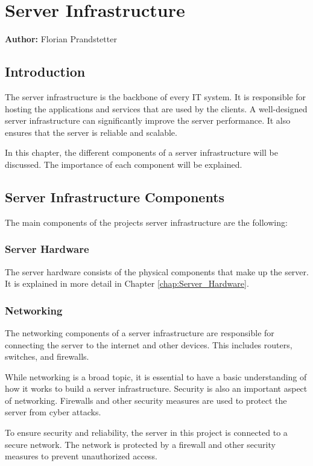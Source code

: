 \chapter{Server Infrastructure}
\label{chap:Server_Infrastructure}
\textbf{Author:} Florian Prandstetter

\section{Introduction}

The server infrastructure is the backbone of every IT system. It is responsible for hosting the applications and services that are used by the clients.
A well-designed server infrastructure can significantly improve the server performance. It also ensures that the server is reliable and scalable.

In this chapter, the different components of a server infrastructure will be discussed. The importance of each component will be explained.

\section{Server Infrastructure Components}

The main components of the projects server infrastructure are the following:

\subsection{Server Hardware}

The server hardware consists of the physical components that make up the server. 
It is explained in more detail in Chapter \ref{chap:Server_Hardware}.

\subsection{Networking}

The networking components of a server infrastructure are responsible for connecting the server to the internet and other devices.
This includes routers, switches, and firewalls.

While networking is a broad topic, it is essential to have a basic understanding of how it works to build a server infrastructure.
Security is also an important aspect of networking. Firewalls and other security measures are used to protect the server from cyber attacks.   

To ensure security and reliability, the server in this project is connected to a secure network. The network is protected by a firewall and other security measures to prevent unauthorized access.


